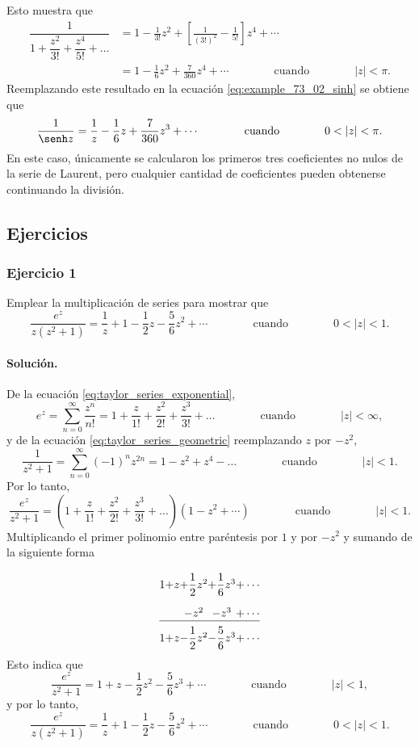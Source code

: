 \documentclass[a4paper]{report}
\begin{document}
Esto muestra que 
\begin{align}
 \dfrac{1}{1+\dfrac{z^2}{3!}+\dfrac{z^4}{5!}+\dots}&=1-\frac{1}{3!}z^2+\left[\frac{1}{(3!)^2}-\frac{1}{5!}\right]z^4+\cdots\nonumber\\
   &=1-\frac{1}{6}z^2+\frac{7}{360}z^4+\cdots
   \qquad\qquad\textrm{cuando}\qquad\qquad
  |z|<\pi.\label{eq:example_73_02_sinh_factor}
\end{align}
Reemplazando este resultado en la ecuación \ref{eq:example_73_02_sinh} se obtiene que 
\[
 \frac{1}{\senh z}=\frac{1}{z}-\frac{1}{6}z+\frac{7}{360}z^3+\cdots
 \qquad\qquad\textrm{cuando}\qquad\qquad
  0<|z|<\pi.
\]
En este caso, únicamente se calcularon los primeros tres coeficientes no nulos de la serie de Laurent, pero cualquier cantidad de coeficientes pueden obtenerse continuando la división.

\subsection*{Ejercicios}

\subsubsection*{Ejercicio 1}

Emplear la multiplicación de series para mostrar que 
\[
 \frac{e^z}{z(z^2+1)}=\frac{1}{z}+1-\frac{1}{2}z-\frac{5}{6}z^2+\cdots 
 \qquad\qquad\textrm{cuando}\qquad\qquad
  0<|z|<1. 
\]

\paragraph{Solución.} De la ecuación \ref{eq:taylor_series_exponential},  
\[
 e^z=\sum_{n=0}^\infty\frac{z^n}{n!}=1+\frac{z}{1!}+\frac{z^2}{2!}+\frac{z^3}{3!}+\dots
 \qquad\qquad\textrm{cuando}\qquad\qquad
 |z|<\infty,
\]
y de la ecuación \ref{eq:taylor_series_geometric} reemplazando \(z\) por \(-z^2\),
\[
 \frac{1}{z^2+1}=\sum_{n=0}^\infty(-1)^nz^{2n}=1-z^2+z^4-\dots
 \qquad\qquad\textrm{cuando}\qquad\qquad
 |z|<1.
\]
Por lo tanto,
\[
 \frac{e^z}{z^2+1}=\left(1+\frac{z}{1!}+\frac{z^2}{2!}+\frac{z^3}{3!}+\dots\right)\left(1-z^2+\cdots\right)
 \qquad\qquad\textrm{cuando}\qquad\qquad
 |z|<1.
\]
Multiplicando el primer polinomio entre paréntesis por \(1\) y por \(-z^2\) y sumando de la siguiente forma
\[
\setlength\arraycolsep{0pt} 
\setlength\extrarowheight{10pt}
\begin{array}[t]{ccccc}
 1 & +z & +\dfrac{1}{2}z^2 & +\dfrac{1}{6}z^3&+\cdots\\
   &   & -z^2           & -z^3&+\cdots\\
\cline{1-5}
 1 & +z & -\dfrac{1}{2}z^2 & -\dfrac{5}{6}z^3&+\cdots
\end{array}
\]
Esto indica que 
\[
 \frac{e^z}{z^2+1}=1+z-\frac{1}{2}z^2-\frac{5}{6}z^3+\cdots
 \qquad\qquad\textrm{cuando}\qquad\qquad
 |z|<1,
\]
y por lo tanto,
\[
 \frac{e^z}{z(z^2+1)}=\frac{1}{z}+1-\frac{1}{2}z-\frac{5}{6}z^2+\cdots
 \qquad\qquad\textrm{cuando}\qquad\qquad
 0<|z|<1.
\]
\end{document}
